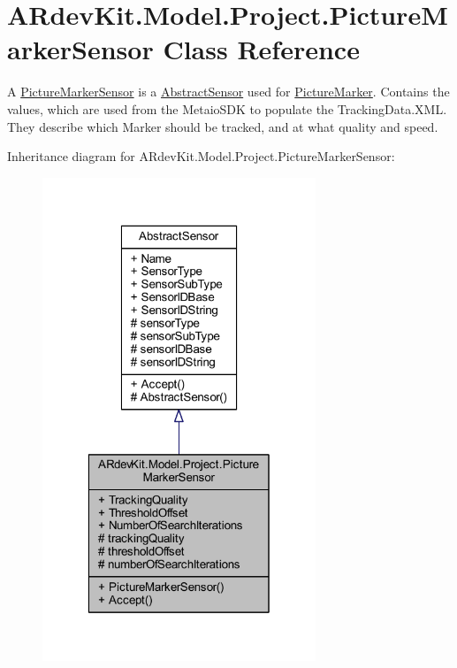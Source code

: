 \hypertarget{class_a_rdev_kit_1_1_model_1_1_project_1_1_picture_marker_sensor}{\section{A\-Rdev\-Kit.\-Model.\-Project.\-Picture\-Marker\-Sensor Class Reference}
\label{class_a_rdev_kit_1_1_model_1_1_project_1_1_picture_marker_sensor}
}


A \hyperlink{class_a_rdev_kit_1_1_model_1_1_project_1_1_picture_marker_sensor}{Picture\-Marker\-Sensor} is a \hyperlink{class_a_rdev_kit_1_1_model_1_1_project_1_1_abstract_sensor}{Abstract\-Sensor} used for \hyperlink{class_a_rdev_kit_1_1_model_1_1_project_1_1_picture_marker}{Picture\-Marker}. Contains the values, which are used from the Metaio\-S\-D\-K to populate the Tracking\-Data.\-X\-M\-L. They describe which Marker should be tracked, and at what quality and speed.  




Inheritance diagram for A\-Rdev\-Kit.\-Model.\-Project.\-Picture\-Marker\-Sensor\-:
\nopagebreak
\begin{figure}[H]
\begin{center}
\leavevmode
\includegraphics[width=232pt]{class_a_rdev_kit_1_1_model_1_1_project_1_1_picture_marker_sensor__inherit__graph}
\end{center}
\end{figure}


